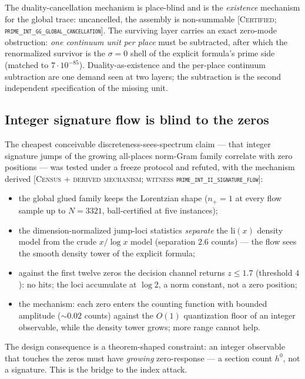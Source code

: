 \documentclass[11pt,reqno]{amsart}
\theoremstyle{plain}
\theoremstyle{definition}
\theoremstyle{remark}
\newcommand{\grade}[1]{\textup{[\textsc{#1}]}}
\begin{document}
The duality-cancellation mechanism is place-blind and is the \emph{existence} mechanism for
the global trace: uncancelled, the assembly is non-summable
\grade{Certified; \texttt{prime\_\allowbreak int\_\allowbreak gg\_\allowbreak global\_\allowbreak cancellation}}. The surviving layer
carries an exact zero-mode obstruction: \emph{one continuum unit per place} must be
subtracted, after which the renormalized survivor is the $\sigma = 0$ shell of the explicit
formula's prime side (matched to $7\cdot10^{-85}$). Duality-as-existence and the
per-place continuum subtraction are one demand seen at two layers; the subtraction is the
second independent specification of the missing unit.

\subsection{Integer signature flow is blind to the zeros}\label{subsec:ii}

The cheapest conceivable discreteness-sees-spectrum claim --- that integer signature jumps of
the growing all-places norm-Gram family correlate with zero positions --- was tested under a
freeze protocol and refuted, with the mechanism derived
\grade{Census $+$ derived mechanism; witness \texttt{prime\_\allowbreak int\_\allowbreak ii\_\allowbreak signature\_\allowbreak flow}}:
\begin{itemize}
\item the global glued family keeps the Lorentzian shape ($n_+ = 1$ at every flow sample up
to $N = 3321$, ball-certified at five instances);
\item the dimension-normalized jump-loci statistics \emph{separate} the $\mathrm{li}(x)$
density model from the crude $x/\log x$ model (separation $2.6$ counts) --- the flow sees the
smooth density tower of the explicit formula;
\item against the first twelve zeros the decision channel returns $z \le 1.7$ (threshold
$4$): no hits; the loci accumulate at $\log 2$, a norm constant, not a zero position;
\item the mechanism: each zero enters the counting function with bounded amplitude
($\sim 0.02$ counts) against the $O(1)$ quantization floor of an integer observable, while
the density tower grows; more range cannot help.
\end{itemize}
The design consequence is a theorem-shaped constraint: an integer observable that touches the
zeros must have \emph{growing} zero-response --- a section count $h^0$, not a signature. This
is the bridge to the index attack.
\end{document}
